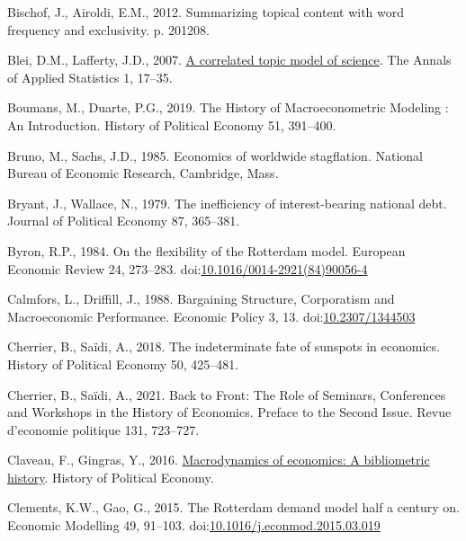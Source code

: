 \documentclass[
  12pt,
  onecolumn]{article}
\newlength{\cslhangindent}
\newlength{\cslentryspacingunit} %
\newenvironment{CSLReferences}[2] %
 {%
  \setlength{\parindent}{0pt}
  \ifodd #1
  \let\oldpar\par
  \def\par{\hangindent=\cslhangindent\oldpar}
  \fi
  \setlength{\parskip}{#2\cslentryspacingunit}
 }%
 {}
\begin{document}
\begin{CSLReferences}{1}{0}
\leavevmode{}%
Bischof, J., Airoldi, E.M., 2012. Summarizing topical content with word
frequency and exclusivity. p. 201208.

\leavevmode{}%
Blei, D.M., Lafferty, J.D., 2007.
\href{https://www.jstor.org/stable/4537420}{A correlated topic model of
science}. The Annals of Applied Statistics 1, 17--35.

\leavevmode{}%
Boumans, M., Duarte, P.G., 2019. The {History} of {Macroeconometric
Modeling} : {An Introduction}. History of Political Economy 51,
391--400.

\leavevmode{}%
Bruno, M., Sachs, J.D., 1985. Economics of worldwide stagflation.
{National Bureau of Economic Research}, {Cambridge, Mass.}

\leavevmode{}%
Bryant, J., Wallace, N., 1979. The inefficiency of interest-bearing
national debt. Journal of Political Economy 87, 365--381.

\leavevmode{}%
Byron, R.P., 1984. On the flexibility of the {Rotterdam} model. European
Economic Review 24, 273--283.
doi:\href{https://doi.org/10.1016/0014-2921(84)90056-4}{10.1016/0014-2921(84)90056-4}

\leavevmode{}%
Calmfors, L., Driffill, J., 1988. Bargaining {Structure}, {Corporatism}
and {Macroeconomic Performance}. Economic Policy 3, 13.
doi:\href{https://doi.org/10.2307/1344503}{10.2307/1344503}

\leavevmode{}%
Cherrier, B., Saïdi, A., 2018. The indeterminate fate of sunspots in
economics. History of Political Economy 50, 425--481.

\leavevmode{}%
Cherrier, B., Saïdi, A., 2021. Back to {Front}: {The Role} of
{Seminars}, {Conferences} and {Workshops} in the {History} of
{Economics}. {Preface} to the {Second Issue}. Revue d'economie politique
131, 723--727.

\leavevmode{}%
Claveau, F., Gingras, Y., 2016.
\href{http://hope.dukejournals.org/cgi/content/short/48/4/551?rss=1}{Macrodynamics
of economics: A bibliometric history}. History of Political Economy.

\leavevmode{}%
Clements, K.W., Gao, G., 2015. The {Rotterdam} demand model half a
century on. Economic Modelling 49, 91--103.
doi:\href{https://doi.org/10.1016/j.econmod.2015.03.019}{10.1016/j.econmod.2015.03.019}


\end{CSLReferences}
\end{document}

